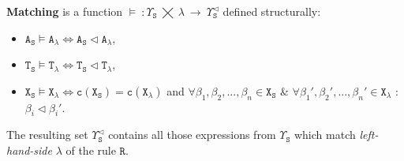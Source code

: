 \documentclass{entcs}
\renewcommand{\~}[0]{\texttildelow}
\begin{document}
\begin{definition}
$ $ \\
\textbf{Matching} is a function $\models ~: \Upsilon_\mathtt{S}~\bigtimes~\lambda~\rightarrow~\Upsilon_\mathtt{S}^{\lhd}$ defined structurally:

\begin{itemize}
	\item $\mathtt{A}_\mathtt{S} \models \mathtt{A}_{\lambda} \Leftrightarrow \mathtt{A}_\mathtt{S} \lhd \mathtt{A}_{\lambda}$,
	\item $\mathtt{T}_\mathtt{S} \models \mathtt{T}_{\lambda} \Leftrightarrow \mathtt{T}_\mathtt{S} \lhd \mathtt{T}_{\lambda}$,
	\item $\mathtt{X}_\mathtt{S} \models \mathtt{X}_{\lambda} \Leftrightarrow \mathtt{c}(\mathtt{X}_\mathtt{S}) = \mathtt{c}(\mathtt{X}_{\lambda})$ and $\forall \beta_1, \beta_2, ..., \beta_n \in \mathtt{X}_\mathtt{S} $ \& $\forall \beta_1', \beta_2', ..., \beta_n' \in \mathtt{X}_{\lambda}$ : $\beta_i \lhd \beta_i'$.
	
\end{itemize}
\noindent The resulting set $\Upsilon_\mathtt{S}^{\lhd}$ contains all those expressions from $\Upsilon_\mathtt{S}$ which match \emph{left-hand-side} $\lambda$ of the rule $\mathtt{R}$.

\end{definition}
\end{document}
